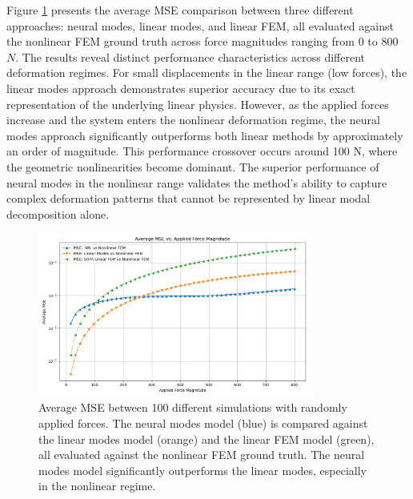 Figure \ref{fig:static_mse_comparison} presents the average MSE comparison between three different approaches: neural modes, linear modes, and linear FEM, all evaluated against the nonlinear FEM ground truth across force magnitudes ranging from $0$ to $800$ $N$. The results reveal distinct performance characteristics across different deformation regimes. For small displacements in the linear range (low forces), the linear modes approach demonstrates superior accuracy due to its exact representation of the underlying linear physics. However, as the applied forces increase and the system enters the nonlinear deformation regime, the neural modes approach significantly outperforms both linear methods by approximately an order of magnitude. This performance crossover occurs around 100 N, where the geometric nonlinearities become dominant. The superior performance of neural modes in the nonlinear range validates the method's ability to capture complex deformation patterns that cannot be represented by linear modal decomposition alone.

\begin{figure}[H]
    \centering
    \includegraphics[width=0.8\textwidth]{Images/beam_static_mse.png}
    \caption{Average MSE between 100 different simulations with randomly applied forces. The neural modes model (blue) is compared against the linear modes model (orange) and the linear FEM model (green), all evaluated against the nonlinear FEM ground truth. The neural modes model significantly outperforms the linear modes, especially in the nonlinear regime.}
    \label{fig:static_mse_comparison}
\end{figure}

